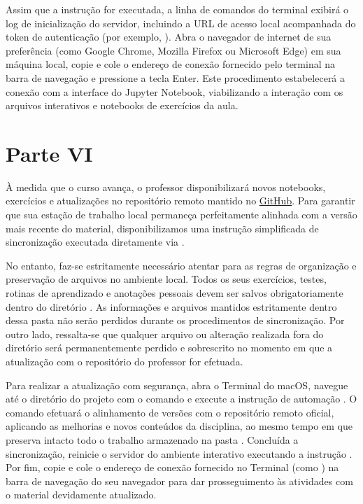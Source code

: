 Assim que a instrução for executada, a linha de comandos do terminal exibirá o log de inicialização do servidor, incluindo a URL de acesso local acompanhada do token de autenticação (por exemplo, ). Abra o navegador de internet de sua preferência (como Google Chrome, Mozilla Firefox ou Microsoft Edge) em sua máquina local, copie e cole o endereço de conexão fornecido pelo terminal na barra de navegação e pressione a tecla Enter. Este procedimento estabelecerá a conexão com a interface do Jupyter Notebook, viabilizando a interação com os arquivos interativos e notebooks de exercícios da aula.


\section*{Parte VI}

À medida que o curso avança, o professor disponibilizará novos notebooks, exercícios e atualizações no repositório remoto mantido no \href{https://github.com/jodafons/rap-2026/tree/main}{GitHub}. Para garantir que sua estação de trabalho local permaneça perfeitamente alinhada com a versão mais recente do material, disponibilizamos uma instrução simplificada de sincronização executada diretamente via .  

No entanto, faz-se estritamente necessário atentar para as regras de organização e preservação de arquivos no ambiente local. Todos os seus exercícios, testes, rotinas de aprendizado e anotações pessoais devem ser salvos obrigatoriamente dentro do diretório . As informações e arquivos mantidos estritamente dentro dessa pasta não serão perdidos durante os procedimentos de sincronização. Por outro lado, ressalta-se que qualquer arquivo ou alteração realizada fora do diretório  será permanentemente perdido e sobrescrito no momento em que a atualização com o repositório do professor for efetuada.

Para realizar a atualização com segurança, abra o Terminal do macOS, navegue até o diretório do projeto com o comando  e execute a instrução de automação . O comando  efetuará o alinhamento de versões com o repositório remoto oficial, aplicando as melhorias e novos conteúdos da disciplina, ao mesmo tempo em que preserva intacto todo o trabalho armazenado na pasta . Concluída a sincronização, reinicie o servidor do ambiente interativo executando a instrução . Por fim, copie e cole o endereço de conexão fornecido no Terminal (como ) na barra de navegação do seu navegador para dar prosseguimento às atividades com o material devidamente atualizado.
